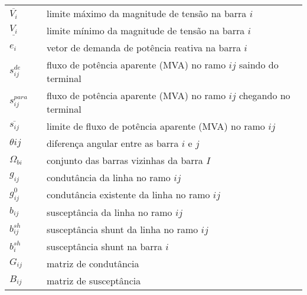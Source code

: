 \begin{tabular}{l c p{.85\linewidth}}
$\overline{V_{i}}$     & & limite máximo da magnitude de tensão na barra $i$\\

$\underline{V_{i}}$    & & limite mínimo da magnitude de tensão na barra $i$\\

$e_{i}$                & & vetor de demanda de potência reativa na barra $i$\\

$s_{ij}^{de}$          & & fluxo de potência aparente (MVA) no ramo $ij$ saindo do terminal\\

$s_{ij}^{para}$        & & fluxo de potência aparente (MVA) no ramo $ij$ chegando no terminal\\

$\overline{s_{ij}}$    & & limite de fluxo de potência aparente (MVA) no ramo $ij$\\

$\theta{ij}$           & & diferença angular entre as barra $i$ e $j$\\

$\Omega_{bi}$          & & conjunto das barras vizinhas da barra $I$\\

$g_{ij}$               & & condutância da linha no ramo $ij$\\

$g_{ij}^0$             & & condutância existente da linha no ramo $ij$\\

$b_{ij}$               & & susceptância da linha no ramo $ij$\\

$b_{ij}^{sh}$          & & susceptância shunt da linha no ramo $ij$\\

$b_{i}^{sh}$           & & susceptância shunt na barra $i$\\

$G_{ij}$               & & matriz de condutância\\

$B_{ij}$               & & matriz de susceptância\\

\end{tabular}
